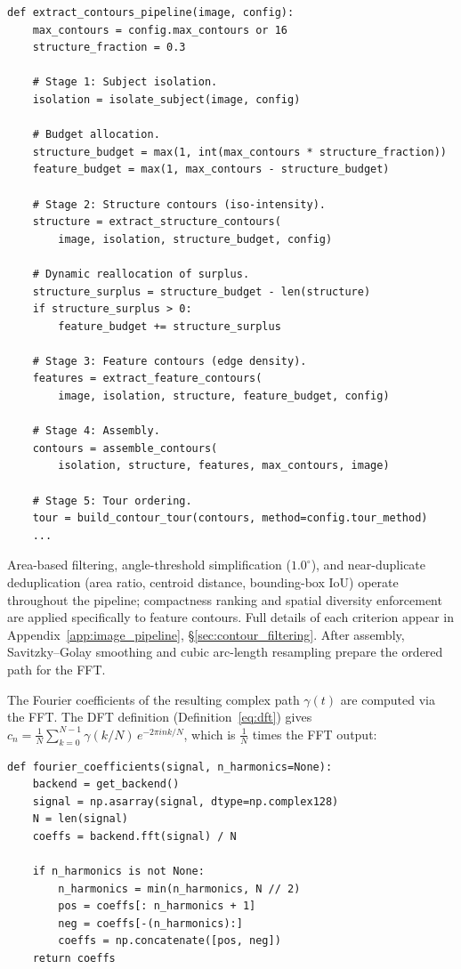\documentclass[12pt,a4paper]{report}
\theoremstyle{thms}
\theoremstyle{defns}
\begin{document}
\begin{lstlisting}[caption={Five-stage pipeline orchestrator (\texttt{contours/pipeline.py})}]
def extract_contours_pipeline(image, config):
    max_contours = config.max_contours or 16
    structure_fraction = 0.3

    # Stage 1: Subject isolation.
    isolation = isolate_subject(image, config)

    # Budget allocation.
    structure_budget = max(1, int(max_contours * structure_fraction))
    feature_budget = max(1, max_contours - structure_budget)

    # Stage 2: Structure contours (iso-intensity).
    structure = extract_structure_contours(
        image, isolation, structure_budget, config)

    # Dynamic reallocation of surplus.
    structure_surplus = structure_budget - len(structure)
    if structure_surplus > 0:
        feature_budget += structure_surplus

    # Stage 3: Feature contours (edge density).
    features = extract_feature_contours(
        image, isolation, structure, feature_budget, config)

    # Stage 4: Assembly.
    contours = assemble_contours(
        isolation, structure, features, max_contours, image)

    # Stage 5: Tour ordering.
    tour = build_contour_tour(contours, method=config.tour_method)
    ...
\end{lstlisting}

Area-based filtering, angle-threshold simplification ($1.0^{\circ}$), and near-duplicate deduplication (area ratio, centroid distance, bounding-box IoU) operate throughout the pipeline; compactness ranking and spatial diversity enforcement are applied specifically to feature contours. Full details of each criterion appear in Appendix~\ref{app:image_pipeline}, \S\ref{sec:contour_filtering}. After assembly, Savitzky--Golay smoothing and cubic arc-length resampling prepare the ordered path for the FFT.

The Fourier coefficients of the resulting complex path $\gamma(t)$ are computed via the FFT. The DFT definition (Definition~\ref{eq:dft}) gives $c_n = \frac{1}{N}\sum_{k=0}^{N-1}\gamma(k/N)\,e^{-2\pi ink/N}$, which is $\frac{1}{N}$ times the FFT output:

\begin{lstlisting}[caption={Fourier coefficient computation (\texttt{series.py})}]
def fourier_coefficients(signal, n_harmonics=None):
    backend = get_backend()
    signal = np.asarray(signal, dtype=np.complex128)
    N = len(signal)
    coeffs = backend.fft(signal) / N

    if n_harmonics is not None:
        n_harmonics = min(n_harmonics, N // 2)
        pos = coeffs[: n_harmonics + 1]
        neg = coeffs[-(n_harmonics):]
        coeffs = np.concatenate([pos, neg])
    return coeffs
\end{lstlisting}
\end{document}

